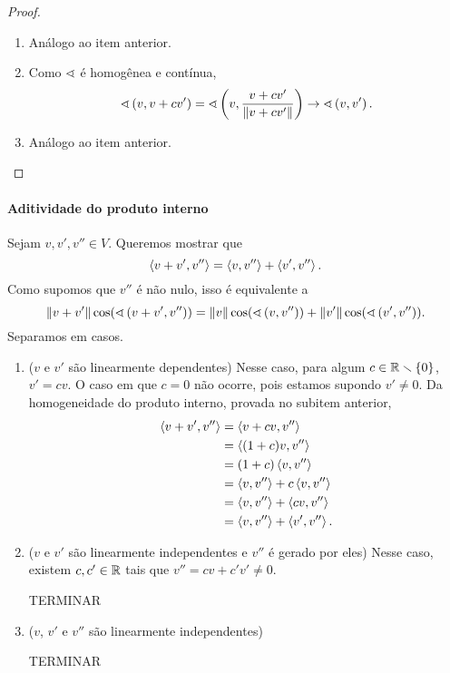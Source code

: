 \begin{proof}
\begin{enumerate}
		\item Análogo ao item anterior.

		\item Como $\sphericalangle$ é homogênea e contínua,
				\begin{equation*}
					\sphericalangle\left({v},{v+cv'}\right) = \sphericalangle\left({v},{\frac{v+cv'}{\left\Vert{v+cv'}\right\Vert}}\right) \rightarrow \sphericalangle\left({v},{v'}\right).
				\end{equation*}
		
		\item Análogo ao item anterior.
	\end{enumerate}
\end{proof}

\paragraph{Aditividade do produto interno} Sejam $v,v',v'' \in V$. Queremos mostrar que
					\begin{equation*}
						\left\langle{v+v'},{v''}\right\rangle = \left\langle{v},{v''}\right\rangle + \left\langle{v'},{v''}\right\rangle.
					\end{equation*}
				Como supomos que $v''$ é não nulo, isso é equivalente a
					\begin{equation*}
						\left\Vert{v+v'}\right\Vert\cos(\sphericalangle\left({v+v'},{v''}\right)) = \left\Vert{v}\right\Vert\cos(\sphericalangle\left({v},{v''}\right)) + \left\Vert{v'}\right\Vert\cos(\sphericalangle\left({v'},{v''}\right)).
					\end{equation*}
				Separamos em casos.
					\begin{enumerate}
						\item ($v$ e $v'$ são linearmente dependentes) Nesse caso, para algum $c \in \mathbb{R} \smallsetminus \{0\}$, $v'=cv$. O caso em que $c=0$ não ocorre, pois estamos supondo $v' \neq 0$. Da homogeneidade do produto interno, provada no subitem anterior,
							\begin{align*}
								\left\langle{v+v'},{v''}\right\rangle &= \left\langle{v+cv},{v''}\right\rangle \\
									&= \left\langle{(1+c)v},{v''}\right\rangle \\
									&= (1+c)\left\langle{v},{v''}\right\rangle \\
									&= \left\langle{v},{v''}\right\rangle + c\left\langle{v},{v''}\right\rangle \\
									&= \left\langle{v},{v''}\right\rangle + \left\langle{cv},{v''}\right\rangle \\
									&= \left\langle{v},{v''}\right\rangle + \left\langle{v'},{v''}\right\rangle.
							\end{align*}
						
						\item ($v$ e $v'$ são linearmente independentes e $v''$ é gerado por eles) Nesse caso, existem $c,c' \in \mathbb{R}$ tais que $v'' = cv+c'v' \neq 0$.
						
						TERMINAR
						
						\item ($v$, $v'$ e $v''$ são linearmente independentes)
						
						TERMINAR

					\end{enumerate}



